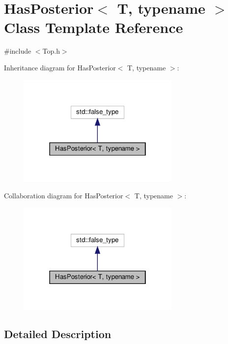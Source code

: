 \hypertarget{struct_has_posterior}{}\section{Has\+Posterior$<$ T, typename $>$ Class Template Reference}
\label{struct_has_posterior}


{\ttfamily \#include $<$Top.\+h$>$}



Inheritance diagram for Has\+Posterior$<$ T, typename $>$\+:\nopagebreak
\begin{figure}[H]
\begin{center}
\leavevmode
\includegraphics[width=226pt]{struct_has_posterior__inherit__graph}
\end{center}
\end{figure}


Collaboration diagram for Has\+Posterior$<$ T, typename $>$\+:\nopagebreak
\begin{figure}[H]
\begin{center}
\leavevmode
\includegraphics[width=226pt]{struct_has_posterior__coll__graph}
\end{center}
\end{figure}


\subsection{Detailed Description}
